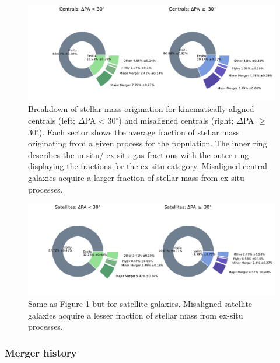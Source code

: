 \documentclass[fleqn,usenatbib]{mnras}
\begin{document}
\begin{figure}
	\includegraphics[width=\linewidth]{tng_results/gas_donut_centrals_PA_split.pdf}
    \caption{Breakdown of stellar mass origination for kinematically aligned centrals (left; $\Delta$PA < 30$^{\circ}$) and misaligned centrals (right; $\Delta$PA $\geq$ 30$^{\circ}$). Each sector shows the average fraction of stellar mass originating from a given process for the population. The inner ring describes the in-situ/ ex-situ gas fractions with the outer ring displaying the fractions for the ex-situ category. Misaligned central galaxies acquire a larger fraction of stellar mass from ex-situ processes.}
    \label{fig:cen_gas_donut}
\end{figure}

\begin{figure}
	\includegraphics[width=\linewidth]{tng_results/gas_donut_satellites_PA_split.pdf}
    \caption{Same as Figure \ref{fig:cen_gas_donut} but for satellite galaxies. Misaligned satellite galaxies acquire a lesser fraction of stellar mass from ex-situ processes.}
    \label{fig:sat_gas_donut}
\end{figure}

\subsubsection{Merger history}
\end{document}
